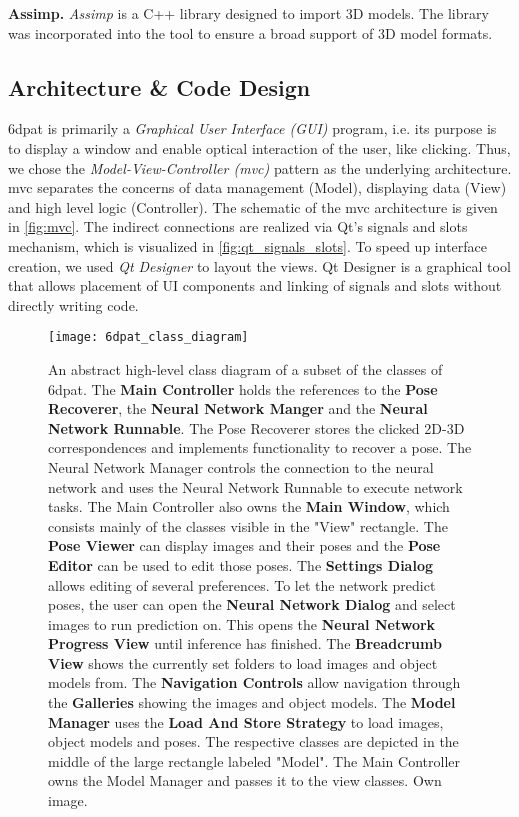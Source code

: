 \noindent\textbf{Assimp.} \textit{Assimp} \cite{assimp} is a C++ library designed to import 3D models. The library was incorporated into the tool to ensure a broad support of 3D model formats.

\subsection{Architecture \& Code Design}

\gls{6dpat} is primarily a \textit{Graphical User Interface (GUI)} program, i.e. its purpose is to display a window and enable optical interaction of the user, like clicking. Thus, we chose the \textit{Model-View-Controller (\gls{mvc})} pattern as the underlying architecture. \gls{mvc} separates the concerns of data management (Model), displaying data (View) and high level logic (Controller). The schematic of the \gls{mvc} architecture is given in \fig \ref{fig:mvc}. The indirect connections are realized via Qt's signals and slots mechanism, which is visualized in \fig \ref{fig:qt_signals_slots}. To speed up interface creation, we used \textit{Qt Designer} to layout the views. Qt Designer is a graphical tool that allows placement of UI components and linking of signals and slots without directly writing code.

\begin{figure}[!tbp]
	\centering
    \texttt{[image: 6dpat\_class\_diagram]}
    \caption{An abstract high-level class diagram of a subset of the classes of \gls{6dpat}. The \textbf{Main Controller} holds the references to the \textbf{Pose Recoverer}, the \textbf{Neural Network Manger} and the \textbf{Neural Network Runnable}. The Pose Recoverer stores the clicked 2D-3D correspondences and implements functionality to recover a pose. The Neural Network Manager controls the connection to the neural network and uses the Neural Network Runnable to execute network tasks. The Main Controller also owns the \textbf{Main Window}, which consists mainly of the classes visible in the "View" rectangle. The \textbf{Pose Viewer} can display images and their poses and the \textbf{Pose Editor} can be used to edit those poses. The \textbf{Settings Dialog} allows editing of several preferences. To let the network predict poses, the user can open the \textbf{Neural Network Dialog} and select images to run prediction on. This opens the \textbf{Neural Network Progress View} until inference has finished. The \textbf{Breadcrumb View} shows the currently set folders to load images and object models from. The \textbf{Navigation Controls} allow navigation through the \textbf{Galleries} showing the images and object models. The \textbf{Model Manager} uses the \textbf{Load And Store Strategy} to load images, object models and poses. The respective classes are depicted in the middle of the large rectangle labeled "Model". The Main Controller owns the Model Manager and passes it to the view classes. Own image.}
    \label{fig:6dpat_class_diagram}
\end{figure}

